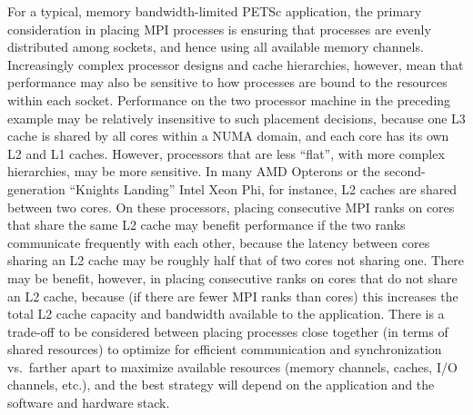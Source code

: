 {{For a typical, memory bandwidth-limited PETSc application, the primary consideration in placing MPI processes is 
ensuring that processes are evenly distributed among sockets, and hence using all available memory channels.
Increasingly complex processor designs and cache hierarchies, however, mean that performance may also be sensitive to how 
processes are bound to the resources within each socket.
Performance on the two processor machine in the preceding example may be relatively insensitive to such placement decisions, 
because one L3 cache is shared by all cores within a NUMA domain, and each core has its own L2 and L1 caches. 
However, processors that are less ``flat'', with more complex hierarchies, may be more sensitive.
In many AMD Opterons or the second-generation ``Knights Landing'' Intel Xeon Phi, for instance, L2 caches are shared 
between two cores.
On these processors, placing consecutive MPI ranks on cores that share the same L2 cache may benefit performance if 
the two ranks communicate frequently with each other, because the latency between cores sharing an L2 
cache may be roughly half that of two cores not sharing one.
There may be benefit, however, in placing consecutive ranks on cores that do not share an L2 cache, because (if there 
are fewer MPI ranks than cores) this increases the total L2 cache capacity and bandwidth available to the application.
There is a trade-off to be considered between placing processes close together (in terms of shared resources) to 
optimize for efficient communication and synchronization vs.\ farther apart to maximize available resources (memory 
channels, caches, I/O channels, etc.), and the best strategy will depend on the application and the software and 
hardware stack.

}}
